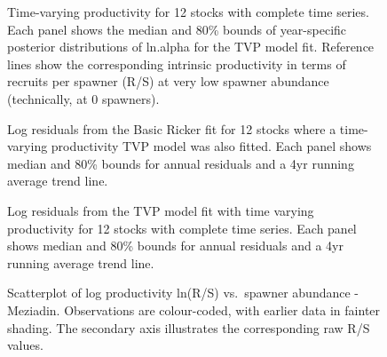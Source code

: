 \documentclass[french,11pt]{book}
\begin{document}
\begin{figure}[htb]

{\centering {} 

}

\caption{Time-varying productivity for 12 stocks with complete time series. Each panel shows the median and 80\% bounds of year-specific posterior distributions of ln.alpha for the TVP model fit. Reference lines show the corresponding intrinsic productivity in terms of recruits per spawner (R/S) at very low spawner abundance (technically, at 0 spawners).}\label{fig:FitsCompProd1}
\end{figure}
\clearpage


\begin{figure}[htb]

{\centering {} 

}

\caption{Log residuals from the Basic Ricker fit for 12 stocks where a time-varying productivity TVP model was also fitted. Each panel shows median and 80\% bounds for annual residuals and a 4yr running average trend line.}\label{fig:FitsCompProd2}
\end{figure}
\clearpage


\begin{figure}[htb]

{\centering {} 

}

\caption{Log residuals from the TVP model fit with time varying productivity for 12 stocks with complete time series. Each panel shows median and 80\% bounds for annual residuals and a 4yr running average trend line.}\label{fig:FitsCompProd3}
\end{figure}
\clearpage


\begin{figure}[htb]

{\centering {} 

}

\caption{Scatterplot of log productivity ln(R/S) vs.~spawner abundance - Meziadin. Observations are colour-coded, with earlier data in fainter shading. The secondary axis illustrates the corresponding raw R/S values.}\label{fig:ScatterMezidian}
\end{figure}
\end{document}
